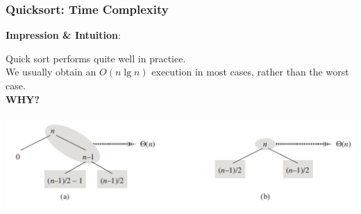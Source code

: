 \documentclass[UTF8,11pt,handout]{beamer}
\begin{document}
\begin{frame}[t]
	\frametitle{Quicksort: Time Complexity}

	\begin{block}{\textbf{\color{red}Impression \& Intuition}:\\
	}
	\begin{center}
		 Quick sort performs quite well in practice.\\\vspace{0.3cm} 
		\pause We usually obtain an $O(n\lg{n})$ execution in most cases, rather than the worst case.\\\vspace{0.3cm} 
		\pause\textbf{\LARGE\color{red}WHY?}\\
		\\
			
		\includegraphics[height=.3\textheight]{figs/quicksort_binary_tree.png}
		
	\end{center}
	\end{block}
\end{frame}
\end{document}
